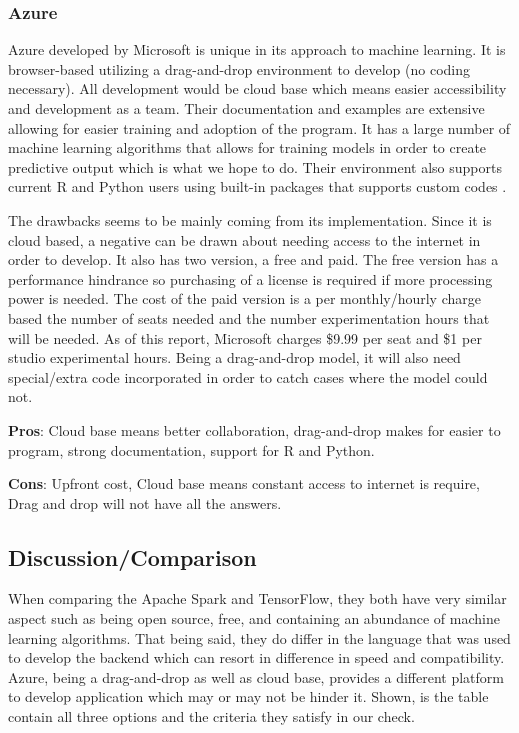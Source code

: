 \documentclass[10pt, onecolumn, draftclsnofoot, letterpaper, compsoc]{IEEEtran}
\begin{document}
    \subsubsection{Azure}
    Azure developed by Microsoft is unique in its approach to machine learning.
    It is browser-based utilizing a drag-and-drop environment to develop (no coding necessary).
    All development would be cloud base which means easier accessibility and development as a team.
    Their documentation and examples are extensive allowing for easier training and adoption of the program.
    It has a large number of machine learning algorithms that allows for training models in order to create predictive output which is what we hope to do.
    Their environment also supports current R and Python users using built-in packages that supports custom codes \cite{azureMain}.\par
    The drawbacks seems to be mainly coming from its implementation.
    Since it is cloud based, a negative can be drawn about needing access to the internet in order to develop.
    It also has two version, a free and paid.
    The free version has a performance hindrance so purchasing of a license is required if more processing power is needed.
    The cost of the paid version is a per monthly/hourly charge based the number of seats needed and the number experimentation hours that will be needed.
    As of this report, Microsoft charges \$9.99 per seat and \$1 per studio experimental hours. 
    Being a drag-and-drop model, it will also need special/extra code incorporated in order to catch cases where the model could not.
    
     \textbf{Pros}: Cloud base means better collaboration, drag-and-drop makes for easier to program, strong documentation, support for R and Python.
     
     \textbf{Cons}: Upfront cost, Cloud base means constant access to internet is require, Drag and drop will not have all the answers.
     
\subsection{Discussion/Comparison}
When comparing the Apache Spark and TensorFlow, they both have very similar aspect such as being open source, free, and containing an abundance of machine learning algorithms.
That being said, they do differ in the language that was used to develop the backend which can resort in difference in speed and compatibility.
Azure, being a drag-and-drop as well as cloud base, provides a different platform to develop application which may or may not be hinder it. 
Shown, is the table contain all three options and the criteria they satisfy in our check.
\end{document}
